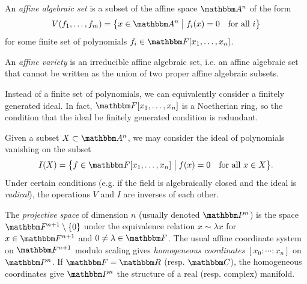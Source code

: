 \documentclass[11pt,titlepage]{article}
\newcommand*{\vbar}{\;\big\vert\;}
\numberwithin{equation}{section}
\begin{document}
    \begin{definition}
        An \emph{affine algebraic set} is a subset of the affine space $\A^n$
        of the form
        \[
            V(f_1, \ldots, f_m)
            = \cdil[\big]{x \in \A^n \vbar f_i(x) = 0 \quad\text{for all $i$}}
        \]
        for some finite set of polynomials $f_i \in \F[x_1, \ldots, x_n]$.

        An \emph{affine variety} is an irreducible affine algebraic set, i.e. an
        affine algebraic set that cannot be written as the union of two proper
        affine algebraic subsets.
    \end{definition}
    \noindent Instead of a finite set of polynomials, we can equivalently
    consider a finitely generated ideal.  In fact, $\F[x_1,\ldots,x_n]$ is a
    Noetherian ring, so the condition that the ideal be finitely generated
    condition is redundant.

    Given a subset $X \subset \A^n$, we may consider the ideal of polynomials
    vanishing on the subset
    \[
        I(X) = \cdil[\big]{f \in \F[x_1, \ldots, x_n] \vbar f(x) = 0 \quad\text{for
        all $x \in X$}}.
    \]
    Under certain conditions (e.g. if the field is algebraically closed and the
    ideal is \emph{radical}), the operations $V$ and $I$ are inverses of each other.

    \begin{definition}
        The \emph{projective space} of dimension $n$ (usually denoted $\Proj^n$)
        is the space $\F^{n+1}\setminus \{0\}$ under the equivalence relation $x
        \sim \lambda x$ for $x \in \F^{n+1}$ and $0 \ne \lambda \in \F$.  The
        usual affine coordinate system on $\F^{n+1}$ modulo scaling gives
        \emph{homogeneous coordinates} $[x_0: \cdots: x_n]$ on $\Proj^n$.  If
        $\F = \R$ (resp.  $\C$), the homogeneous coordinates give $\Proj^n$ the
        structure of a real (resp. complex) manifold.
    \end{definition}
\end{document}
